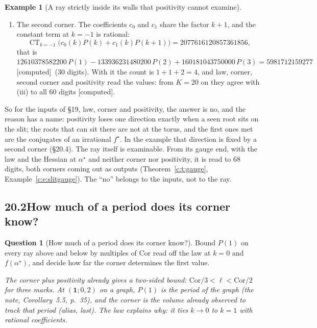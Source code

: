 \documentclass[11pt]{article}
\newcommand{\one}{\mathbf 1}
\DeclareMathOperator*{\CT}{CT}
\theoremstyle{plain}
\theoremstyle{definition}
\newtheorem{question}[proposition]{Question}
\newtheorem{example}[proposition]{Example}
\theoremstyle{remark}
\newcommand{\computed}{\textup{[computed]}}
\begin{document}
\begin{example}[A ray strictly inside its walls that positivity cannot examine]
\begin{enumerate}[label=(\roman*)]
\begin{gather*}
P(2)=0.00132119179498773222717641714721510065075969610885135498475\ldots,
\end{gather*}
with $P(3)$, $P(4)$, $P(5)$ to the same precision; the law holds at $k=1$ to $60$ digits.
\item The second corner. The coefficients $c_0$ and $c_1$ share the factor $k+1$, and the constant term at $k=-1$ is rational:
\[
\CT_{k=-1}\big(c_0(k)P(k)+c_1(k)P(k+1)\big)=2077616120857361856,
\]
that is $12610378582200\,P(1)-133936231480200\,P(2)+160181043750000\,P(3)=5981712159277$ \computed\ ($30$ digits). With it the count is $1+1+2=4$, and law, corner, second corner and positivity read the values: from $K=20$ on they agree with (iii) to all $60$ digits \computed.
\end{enumerate}
\end{example}

\noindent So for the inputs of \S19, law, corner and positivity, the answer is no, and the reason has a name: positivity loses one direction exactly when a seen root sits on the slit; the roots that can sit there are not at the torus, and the first ones met are the conjugates of an irrational $f^\star$. In the example that direction is fixed by a second corner (\S20.4). The ray itself is examinable. From its gauge end, with the law and the Hessian at $\alpha^\star$ and neither corner nor positivity, it is read to $68$ digits, both corners coming out as outputs (Theorem~\ref{c:t:gauge}, Example~\ref{c:e:slitgauge}). The ``no'' belongs to the inputs, not to the ray.

\subsection*{20.2\quad How much of a period does its corner know?}

\begin{question}[How much of a period does its corner know?]\label{a:q:corner}
Bound $P(1)$ on every ray above and below by multiples of $\mathrm{Cor}$ read off the law at $k=0$ and $f(\alpha^\star)$, and decide how far the corner determines the first value.
\end{question}

\emph{The corner plus positivity already gives a two-sided bound: $\mathrm{Cor}/3<\ell<\mathrm{Cor}/2$ for three marks. At $(\one;0,2)$ on a graph, $P(1)$ is the period of the graph (the note, Corollary~5.5, p.~35), and the corner is the volume already observed to track that period (alias, last). The law explains why: it ties $k\to0$ to $k=1$ with rational coefficients.}
\end{document}
